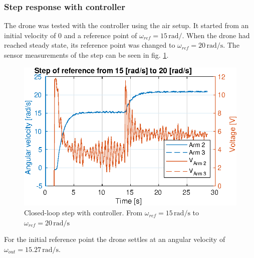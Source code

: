 \subsubsection{Step response with controller}
The drone was tested with the controller using the air setup. It started from an initial velocity of 0 and a reference point of $\omega_{ref} = 15 \, \text{rad/}$. When the drone had reached steady state, its reference point was changed to $\omega_{ref} = 20 \, \text{rad/s}$. The sensor measurements of the step can be seen in fig. \ref{fig:stepwithcontroller}.
\begin{figure}[h]
    \centering
    \includegraphics{figures/results/stepwithcontroller.eps}
    \caption{Closed-loop step with controller. From $\omega_{ref} = 15\, \text{rad/s}$ to $\omega_{ref} = 20\, \text{rad/s}$}
    \label{fig:stepwithcontroller}
\end{figure}
For the initial reference point the drone settles at an angular velocity of $\omega_{out} = 15.27 \,\text{rad/s}$.

